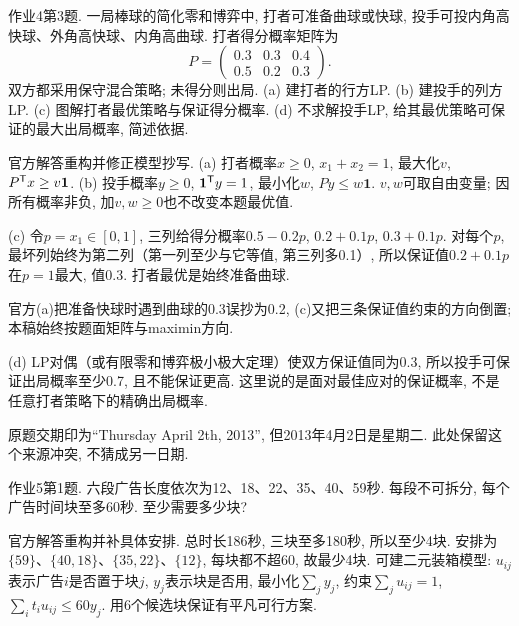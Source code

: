 \begin{exercise}\label{ass:15053-ps4-q3}
作业4第3题. 一局棒球的简化零和博弈中, 打者可准备曲球或快球, 投手可投内角高快球、外角高快球、内角高曲球. 打者得分概率矩阵为
\[
P=\begin{pmatrix}0.3&0.3&0.4\\0.5&0.2&0.3\end{pmatrix}.
\]
双方都采用保守混合策略; 未得分则出局. (a) 建打者的行方LP. (b) 建投手的列方LP. (c) 图解打者最优策略与保证得分概率. (d) 不求解投手LP, 给其最优策略可保证的最大出局概率, 简述依据.
\end{exercise}
\begin{solution}
官方解答重构并修正模型抄写. (a) 打者概率$x\ge0$, $x_1+x_2=1$, 最大化$v$, $P^{\mathsf T} x\ge v\mathbf1$. (b) 投手概率$y\ge0$, $\mathbf1^{\mathsf T} y=1$, 最小化$w$, $Py\le w\mathbf1$. $v,w$可取自由变量; 因所有概率非负, 加$v,w\ge0$也不改变本题最优值.

(c) 令$p=x_1\in[0,1]$, 三列给得分概率$0.5-0.2p$, $0.2+0.1p$, $0.3+0.1p$. 对每个$p$, 最坏列始终为第二列（第一列至少与它等值, 第三列多0.1）, 所以保证值$0.2+0.1p$在$p=1$最大, 值0.3. 打者最优是始终准备曲球.
\begin{center}\end{center}
官方(a)把准备快球时遇到曲球的0.3误抄为0.2, (c)又把三条保证值约束的方向倒置; 本稿始终按题面矩阵与maximin方向.

(d) LP对偶（或有限零和博弈极小极大定理）使双方保证值同为0.3, 所以投手可保证出局概率至少0.7, 且不能保证更高. 这里说的是面对最佳应对的保证概率, 不是任意打者策略下的精确出局概率.
\end{solution}

原题交期印为“Thursday April 2th, 2013”, 但2013年4月2日是星期二. 此处保留这个来源冲突, 不猜成另一日期.

\begin{exercise}\label{ass:15053-ps5-q1}
作业5第1题. 六段广告长度依次为12、18、22、35、40、59秒. 每段不可拆分, 每个广告时间块至多60秒. 至少需要多少块?
\end{exercise}
\begin{solution}
官方解答重构并补具体安排. 总时长186秒, 三块至多180秒, 所以至少4块. 安排为$\{59\}$、$\{40,18\}$、$\{35,22\}$、$\{12\}$, 每块都不超60, 故最少4块. 可建二元装箱模型: $u_{ij}$表示广告$i$是否置于块$j$, $y_j$表示块是否用, 最小化$\sum_jy_j$, 约束$\sum_ju_{ij}=1$, $\sum_it_iu_{ij}\le60y_j$. 用6个候选块保证有平凡可行方案.
\end{solution}

